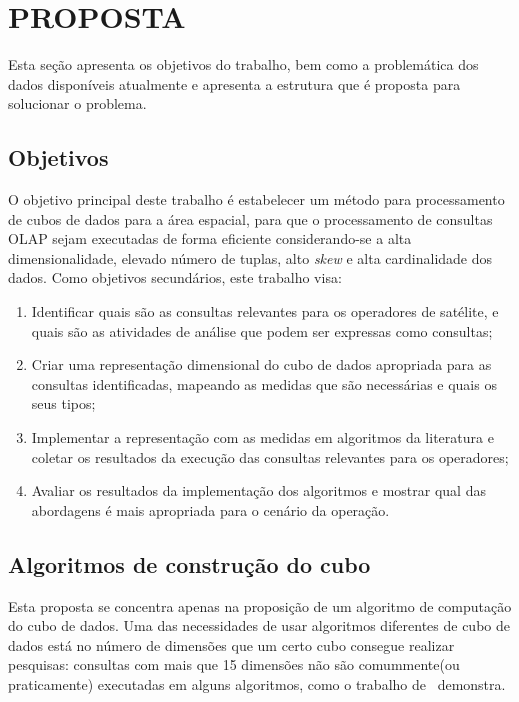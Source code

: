 
\chapter{PROPOSTA}\label{ch:prop}

Esta seção apresenta os objetivos do trabalho, bem como a problemática dos dados disponíveis atualmente e apresenta a estrutura que é proposta para solucionar o problema.

\section{Objetivos}\label{ch:prop:obj}

O objetivo principal deste trabalho é estabelecer um método para processamento de cubos de dados para a área espacial, para que o processamento de consultas OLAP sejam executadas de forma eficiente considerando-se a alta dimensionalidade, elevado número de tuplas, alto \textit{skew} e alta cardinalidade dos dados.
Como objetivos secundários, este trabalho visa:

\begin{enumerate}
\item Identificar quais são as consultas relevantes para os operadores de satélite, e quais são as atividades de análise que podem ser expressas como consultas;
\item Criar uma representação dimensional do cubo de dados apropriada para as consultas identificadas, mapeando as medidas que são necessárias e quais os seus tipos;
\item Implementar a representação com as medidas em algoritmos da literatura e coletar os resultados da execução das consultas relevantes para os operadores;
\item Avaliar os resultados da implementação dos algoritmos e mostrar qual das abordagens é mais apropriada para o cenário da operação.
\end{enumerate}

\section{Algoritmos de construção do cubo}\label{ch:prop:cube}

Esta proposta se concentra apenas na proposição de um algoritmo de computação do cubo de dados.
Uma das necessidades de usar algoritmos diferentes de cubo de dados está no número de dimensões que um certo cubo consegue realizar pesquisas: consultas com mais que 15 dimensões não são comummente(ou praticamente) executadas em alguns algoritmos, como o trabalho de~ demonstra.

